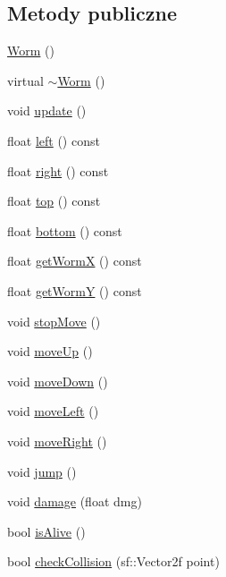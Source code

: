 \subsection*{Metody publiczne}
\begin{DoxyCompactItemize}
\item 
\mbox{\hyperlink{class_worm_aaec23e2156f969303d6bfac36cae63e3}{Worm}} ()
\item 
virtual \mbox{\hyperlink{class_worm_ade7672966c551bb91663ed03e06f297f}{$\sim$\+Worm}} ()
\item 
void \mbox{\hyperlink{class_worm_adcb6219ae98887e491327c4ef02cf4b9}{update}} ()
\item 
float \mbox{\hyperlink{class_worm_ab517b492de0e583254c288cc583cbeb1}{left}} () const
\item 
float \mbox{\hyperlink{class_worm_a52905b36980b4aa37fe1b004df9edc0e}{right}} () const
\item 
float \mbox{\hyperlink{class_worm_a3d65c40350e8e0317bd594a3cb7c8bba}{top}} () const
\item 
float \mbox{\hyperlink{class_worm_a68061fb5be175ab42739a7c157d7073d}{bottom}} () const
\item 
float \mbox{\hyperlink{class_worm_a9787181c41ca3a4ac5098277e8a4a142}{get\+WormX}} () const
\item 
float \mbox{\hyperlink{class_worm_aa1a5e5334f8d3e339f15b36a9af31f27}{get\+WormY}} () const
\item 
void \mbox{\hyperlink{class_worm_a1cdb0c544127417ba4b95fd8e5d3f9fc}{stop\+Move}} ()
\item 
void \mbox{\hyperlink{class_worm_ae2d842c005b7bc4b20ae8333ebc9c19c}{move\+Up}} ()
\item 
void \mbox{\hyperlink{class_worm_a08f64ed1ed9149084d8d64296253c4be}{move\+Down}} ()
\item 
void \mbox{\hyperlink{class_worm_a93d02457a10bbbfc1d2028168419ecb8}{move\+Left}} ()
\item 
void \mbox{\hyperlink{class_worm_a6d4b33910c18b0e266e310d9b5512d75}{move\+Right}} ()
\item 
void \mbox{\hyperlink{class_worm_ae4cd763e0edd18cecab42b39142cea14}{jump}} ()
\item 
void \mbox{\hyperlink{class_worm_aa57fe22ce4031e5332d16d709e7274c8}{damage}} (float dmg)
\item 
bool \mbox{\hyperlink{class_worm_a606868b7856598eef50b8ebcd2374927}{is\+Alive}} ()
\item 
bool \mbox{\hyperlink{class_worm_a61589ff1104deb3cbf1cb6978e7f95f4}{check\+Collision}} (sf\+::\+Vector2f point)

\end{DoxyCompactItemize}

